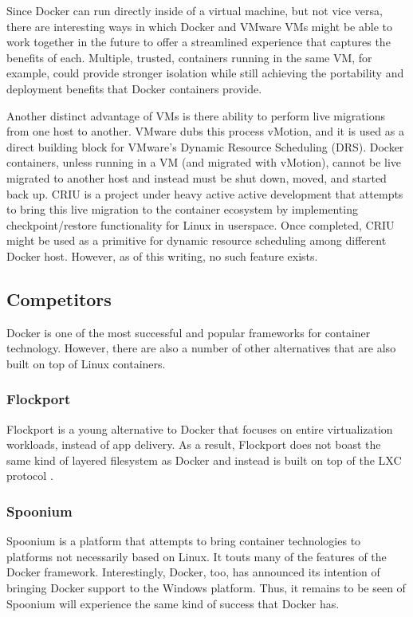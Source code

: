 Since Docker can run directly inside of a virtual machine, but not vice versa, there are interesting ways in which Docker and VMware VMs might be able to work together in the future to offer a streamlined experience that captures the benefits of each. Multiple, trusted, containers running in the same VM, for example, could provide stronger isolation while still achieving the portability and deployment benefits that Docker containers provide.

Another distinct advantage of VMs is there ability to perform live migrations from one host to another. VMware dubs this process vMotion\cite{vmotion}, and it is used as a direct building block for VMware's Dynamic Resource Scheduling (DRS)\cite{DRS}. Docker containers, unless running in a VM (and migrated with vMotion), cannot be live migrated to another host and instead must be shut down, moved, and started back up. CRIU\cite{CRIU} is a project under heavy active active development that attempts to bring this live migration to the container ecosystem by implementing checkpoint/restore functionality for Linux in userspace. Once completed, CRIU might be used as a primitive for dynamic resource scheduling among different Docker host. However, as of this writing, no such feature exists.
\subsection{Competitors}
Docker is one of the most successful and popular frameworks for container technology. However, there are also a number of other alternatives that are also built on top of Linux containers. 

\subsubsection{Flockport}
Flockport is a young alternative to Docker that focuses on entire virtualization workloads, instead of app delivery. As a result, Flockport does not boast the same kind of layered filesystem as Docker and instead is built on top of the LXC protocol \cite{flockport}.

\subsubsection{Spoonium}
Spoonium is a platform that attempts to bring container technologies to platforms not necessarily based on Linux. It touts many of the features of the Docker framework. Interestingly, Docker, too, has announced its intention of bringing Docker support to the Windows platform. Thus, it remains to be seen of Spoonium will experience the same kind of success that Docker has.


